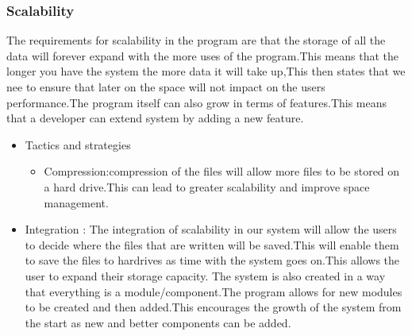 
%

\subsubsection{Scalability}
\begin{flushleft}
The requirements for scalability in the program are that the storage of all the data will forever expand with the more uses of the program.This means that the longer you have the system the more data it will take up,This then states that we nee to ensure that later on the space will not impact on the users performance.The program itself can also grow in terms of features.This means that a developer can extend system by adding a new feature.
\begin{itemize}
\item{Tactics and strategies}
\begin{itemize}
\item{Compression}:compression of the files will allow more files to be stored on a hard drive.This can lead to greater scalability and improve space management.
\end{itemize}

\item{Integration} :
The integration of scalability in our system will allow the users to decide where the files that are written will be saved.This will enable them to save the files to hardrives as time with the system goes on.This allows the user to expand their storage capacity.
The system is also created in a way that everything is a module/component.The program allows for new modules to be created and then added.This encourages the growth of the system from the start as new and better components can be added.
\end{itemize}

\end{flushleft}
		
